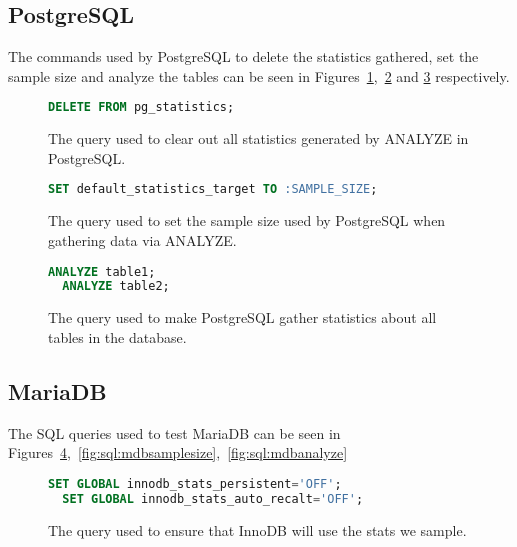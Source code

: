 \subsection{PostgreSQL}
The commands used by PostgreSQL to delete the statistics gathered, set the
sample size and analyze the tables can be
seen in Figures~\ref{fig:sql:pgstatistics},~\ref{fig:sql:pgsamplesize} and
\ref{fig:sql:pganalyze} respectively.

\begin{figure}[ht]
\begin{lstlisting}[language=SQL]
  DELETE FROM pg_statistics;
\end{lstlisting}
\caption[Clearing the statistics in PostgreSQL]{The query used to clear out all
  statistics generated by ANALYZE in PostgreSQL.}
\label{fig:sql:pgstatistics}
\end{figure}

\begin{figure}[ht]
\begin{lstlisting}[language=SQL]
  SET default_statistics_target TO :SAMPLE_SIZE;
\end{lstlisting}
\caption[Setting the sample size in PostgreSQL.]{The query used to set the
  sample size used by PostgreSQL when gathering data via ANALYZE.}
\label{fig:sql:pgsamplesize}
\end{figure}

\begin{figure}[ht]
\begin{lstlisting}[language=SQL]
  ANALYZE table1;
  ANALYZE table2;
\end{lstlisting}
\caption[Analyzing the tables in PostgreSQL.]{The query used to make PostgreSQL
  gather statistics about all tables in the database.}
\label{fig:sql:pganalyze}
\end{figure}

\subsection{MariaDB}
The SQL queries used to test MariaDB can be seen in
Figures~\ref{fig:sql:mdbstatistics},~\ref{fig:sql:mdbsamplesize},~\ref{fig:sql:mdbanalyze}

\begin{figure}[ht]
\begin{lstlisting}[language=SQL]
  SET GLOBAL innodb_stats_persistent='OFF';
  SET GLOBAL innodb_stats_auto_recalt='OFF';
\end{lstlisting}
\caption[Ensure InnoDB use the stats we sample.]{The query used to ensure that
  InnoDB will use the stats we sample.}
\label{fig:sql:mdbstatistics}
\end{figure}

